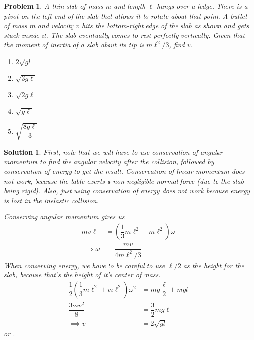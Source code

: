\documentclass[12pt]{article}
\newcommand{\clearpts}{\addtocounter{tpts}{\value{cpts}} \setcounter{cpts}{0}}
\newcommand{\pts}[1]{\clearpts \setcounter{cpts}{#1}}
\newtheorem*{solution}{Solution}
\theoremstyle{mystyle}
\newtheorem{pproblem}{Problem}
\begin{document}
\pts{2}
\begin{pproblem}
    A thin slab of mass $m$ and length $\ell$ hangs over a ledge. There is a pivot on the left end of the slab that allows it to rotate about that point. A bullet of mass $m$ and velocity $v$ hits the bottom-right edge of the slab as shown and gets stuck inside it. The slab eventually comes to rest perfectly vertically. Given that the moment of inertia of a slab
    about its tip is $m\ell^2/3$, find $v$.
    
    \begin{figure}[H]
        \centering
    \end{figure}
    
    \begin{enumerate}[(\Alph*)]
        \item $2\sqrt{gl}$
        \item $\sqrt{3g\ell}$
        \item $\sqrt{2g\ell}$
        \item $\sqrt{g\ell}$
        \item $\sqrt{\dfrac{8g\ell}{3}}$
    \end{enumerate}
\end{pproblem}
\begin{solution}
    First, note that we will have to use conservation of angular momentum to find the
    angular velocity after the collision, followed by
    conservation of energy to get the result. Conservation of linear momentum does
    not work, because the table exerts a non-negligible normal force (due to the
    slab being rigid). Also, just using conservation of energy does not work because
    energy is lost in the inelastic collision.

    Conserving angular momentum gives us
    \begin{align*}
       mv\ell&=\left(\dfrac{1}{3}m\ell^2+m\ell^2\right)\omega\\
       \implies \omega&=\dfrac{mv}{4m\ell^2/3}
    \end{align*}
    When conserving energy, we have to be careful to use $\ell/2$ as the height
    for the slab, because that's the height of it's center of mass.
    \begin{align*}
        \dfrac{1}{2}\left(\dfrac{1}{3}m\ell^2+m\ell^2\right)\omega^2 &= mg\dfrac{\ell}{2}+mgl\\
        \dfrac{3mv^2}{8} &= \dfrac{3}{2}mg\ell\\
        \implies v &= 2\sqrt{gl}
    \end{align*}
    or .
\end{solution}
\end{document}
